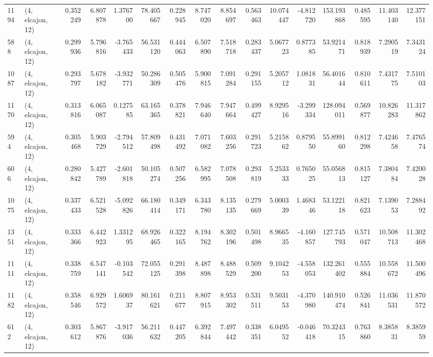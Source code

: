 \begin{tabular}{llrrrrrrrrrrrrrr}
1194 &  (4, elcajon, 12) &   0.352249 &   6.807878 &   1.376700 &     78.405667 &    0.228945 &    8.747020 &    8.854697 &  0.563463 &  10.074447 &  -4.812720 &   153.193868 &   0.485595 &  11.403140 &  12.377151 \\
588  &  (4, elcajon, 12) &   0.299936 &   5.796816 &  -3.765433 &     56.531120 &    0.444063 &    6.507890 &    7.518718 &  0.283437 &   5.067723 &   0.877385 &    53.921471 &   0.818939 &   7.290519 &   7.343124 \\
1087 &  (4, elcajon, 12) &   0.293797 &   5.678182 &  -3.932771 &     50.286309 &    0.505476 &    5.900815 &    7.091284 &  0.291155 &   5.205712 &   1.081831 &    56.401644 &   0.810611 &   7.431775 &   7.510103 \\
1170 &  (4, elcajon, 12) &   0.313816 &   6.065087 &   0.127585 &     63.165365 &    0.378821 &    7.946640 &    7.947664 &  0.499427 &   8.929516 &  -3.299334 &   128.094011 &   0.569877 &  10.826283 &  11.317862 \\
594  &  (4, elcajon, 12) &   0.305468 &   5.903729 &  -2.794512 &     57.809498 &    0.431492 &    7.071082 &    7.603256 &  0.291723 &   5.215862 &   0.879550 &    55.899160 &   0.812298 &   7.424658 &   7.476574 \\
606  &  (4, elcajon, 12) &   0.280842 &   5.427789 &  -2.601818 &     50.105274 &    0.507256 &    6.582995 &    7.078508 &  0.293819 &   5.253333 &   0.765025 &    55.056813 &   0.815127 &   7.380484 &   7.420028 \\
1075 &  (4, elcajon, 12) &   0.337433 &   6.521528 &  -5.092826 &     66.180414 &    0.349171 &    6.343780 &    8.135135 &  0.279669 &   5.000339 &   1.468346 &    53.122118 &   0.821623 &   7.139053 &   7.288492 \\
1351 &  (4, elcajon, 12) &   0.333366 &   6.442923 &   1.331295 &     68.926465 &    0.322165 &    8.194762 &    8.302196 &  0.501498 &   8.966535 &  -4.160857 &   127.745793 &   0.571047 &  10.508713 &  11.302468 \\
1111 &  (4, elcajon, 12) &   0.338759 &   6.547141 &  -0.103542 &     72.055125 &    0.291398 &    8.487898 &    8.488529 &  0.509200 &   9.104253 &  -4.558053 &   132.261402 &   0.555884 &  10.558672 &  11.500496 \\
1182 &  (4, elcajon, 12) &   0.358546 &   6.929572 &   1.606937 &     80.161621 &    0.211677 &    8.807915 &    8.953302 &  0.531511 &   9.503153 &  -4.370980 &   140.910474 &   0.526841 &  11.036531 &  11.870572 \\
612  &  (4, elcajon, 12) &   0.303612 &   5.867876 &  -3.917036 &     56.211632 &    0.447205 &    6.392844 &    7.497442 &  0.338351 &   6.049552 &  -0.046418 &    70.324315 &   0.763860 &   8.385831 &   8.385959 \\

\end{tabular}
